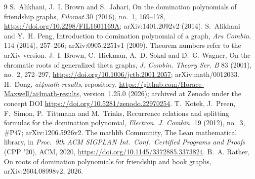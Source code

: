 \documentclass[11pt]{article}
\theoremstyle{definition}
\theoremstyle{remark}
\newcommand{\repoversion}{1.25.0}
\begin{document}
{\small
\begin{thebibliography}{9}
\setlength{\itemsep}{0pt}
 S.~Alikhani, J.~I. Brown and S.~Jahari, On the domination
polynomials of friendship graphs, \emph{Filomat} 30 (2016), no.~1, 169--178,
\url{https://doi.org/10.2298/FIL1601169A}; arXiv:1401.2092v2 (2014).
 S.~Alikhani and Y.~H. Peng, Introduction to domination
polynomial of a graph, \emph{Ars Combin.} 114 (2014), 257--266;
arXiv:0905.2251v1 (2009). Theorem numbers refer to the arXiv version.
 J.~I. Brown, C.~Hickman, A.~D. Sokal and D.~G. Wagner, On the
chromatic roots of generalized theta graphs, \emph{J. Combin. Theory Ser. B}
83 (2001), no.~2, 272--297, \url{https://doi.org/10.1006/jctb.2001.2057};
arXiv:math/0012033.
 H.~Dong, \emph{ai4math-results}, repository,
\url{https://github.com/Horace-Maxwell/ai4math-results}, version~\repoversion{}
(2026); archived at Zenodo under the concept DOI
\url{https://doi.org/10.5281/zenodo.22970254}.
 T.~Kotek, J.~Preen, F.~Simon, P.~Tittmann and M.~Trinks,
Recurrence relations and splitting formulas for the domination polynomial,
\emph{Electron. J. Combin.} 19 (2012), no.~3, \#P47; arXiv:1206.5926v2.
The mathlib Community, The Lean mathematical library, in \emph{Proc.\ 9th ACM
SIGPLAN Int.\ Conf.\ Certified Programs and Proofs} (CPP '20), ACM, 2020,
\url{https://doi.org/10.1145/3372885.3373824}.
 B.~A. Rather, On roots of domination polynomials for friendship
and book graphs, arXiv:2604.08998v2, 2026.
\end{thebibliography}}
\end{document}
